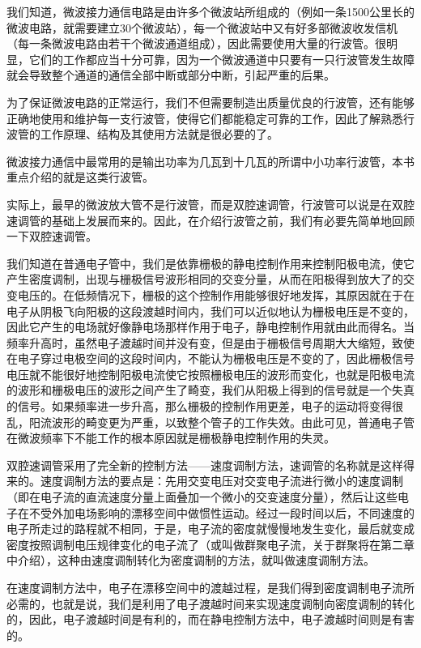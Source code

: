 我们知道，微波接力通信电路是由许多个微波站所组成的（例如一条1500公里长的微波电路，就需要建立30个微波站），每一个微波站中又有好多部微波收发信机（每一条微波电路由若干个微波通道组成），因此需要使用大量的行波管。很明显，它们的工作都应当十分可靠，因为一个微波通道中只要有一只行波管发生故障就会导致整个通道的通信全部中断或部分中断，引起严重的后果。

为了保证微波电路的正常运行，我们不但需要制造出质量优良的行波管，还有能够正确地使用和维护每一支行波管，使得它们都能稳定可靠的工作，因此了解熟悉行波管的工作原理、结构及其使用方法就是很必要的了。

微波接力通信中最常用的是输出功率为几瓦到十几瓦的所谓中小功率行波管，本书重点介绍的就是这类行波管。

实际上，最早的微波放大管不是行波管，而是双腔速调管，行波管可以说是在双腔速调管的基础上发展而来的。因此，在介绍行波管之前，我们有必要先简单地回顾一下双腔速调管。

我们知道在普通电子管中，我们是依靠栅极的静电控制作用来控制阳极电流，使它产生密度调制，出现与栅极信号波形相同的交变分量，从而在阳极得到放大了的交变电压的。在低频情况下，栅极的这个控制作用能够很好地发挥，其原因就在于在电子从阴极飞向阳极的这段渡越时间内，我们可以近似地认为栅极电压是不变的，因此它产生的电场就好像静电场那样作用于电子，静电控制作用就由此而得名。当频率升高时，虽然电子渡越时间并没有变，但是由于栅极信号周期大大缩短，致使在电子穿过电极空间的这段时间内，不能认为栅极电压是不变的了，因此栅极信号电压就不能很好地控制阳极电流使它按照栅极电压的波形而变化，也就是阳极电流的波形和栅极电压的波形之间产生了畸变，我们从阳极上得到的信号就是一个失真的信号。如果频率进一步升高，那么栅极的控制作用更差，电子的运动将变得很乱，阳流波形的畸变更为严重，以致整个管子的工作失效。由此可见，普通电子管在微波频率下不能工作的根本原因就是栅极静电控制作用的失灵。

双腔速调管采用了完全新的控制方法——速度调制方法，速调管的名称就是这样得来的。速度调制方法的要点是：先用交变电压对交变电子流进行微小的速度调制（即在电子流的直流速度分量上面叠加一个微小的交变速度分量），然后让这些电子在不受外加电场影响的漂移空间中做惯性运动。经过一段时间以后，不同速度的电子所走过的路程就不相同，于是，电子流的密度就慢慢地发生变化，最后就变成密度按照调制电压规律变化的电子流了（或叫做群聚电子流，关于群聚将在第二章中介绍），这种由速度调制转化为密度调制的方法，就叫做速度调制方法。

在速度调制方法中，电子在漂移空间中的渡越过程，是我们得到密度调制电子流所必需的，也就是说，我们是利用了电子渡越时间来实现速度调制向密度调制的转化的，因此，电子渡越时间是有利的，而在静电控制方法中，电子渡越时间则是有害的。

